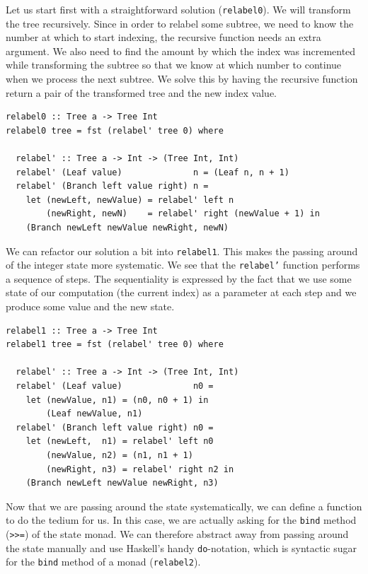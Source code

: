 \documentclass{article}
\begin{document}
Let us start first with a straightforward solution (\texttt{relabel0}). We
will transform the tree recursively. Since in order to relabel some subtree,
we need to know the number at which to start indexing, the recursive function
needs an extra argument. We also need to find the amount by which the index
was incremented while transforming the subtree so that we know at which number
to continue when we process the next subtree. We solve this by having the
recursive function return a pair of the transformed tree and the new index
value.

\begin{lstlisting}
relabel0 :: Tree a -> Tree Int
relabel0 tree = fst (relabel' tree 0) where

  relabel' :: Tree a -> Int -> (Tree Int, Int)
  relabel' (Leaf value)              n = (Leaf n, n + 1)
  relabel' (Branch left value right) n =
    let (newLeft, newValue) = relabel' left n
        (newRight, newN)    = relabel' right (newValue + 1) in
    (Branch newLeft newValue newRight, newN)
\end{lstlisting}

We can refactor our solution a bit into \texttt{relabel1}. This makes the
passing around of the integer state more systematic. We see that the
\texttt{relabel'} function performs a sequence of steps. The sequentiality is
expressed by the fact that we use some state of our computation (the current
index) as a parameter at each step and we produce some value and the new
state.

\begin{lstlisting}
relabel1 :: Tree a -> Tree Int
relabel1 tree = fst (relabel' tree 0) where

  relabel' :: Tree a -> Int -> (Tree Int, Int)
  relabel' (Leaf value)              n0 =
    let (newValue, n1) = (n0, n0 + 1) in
        (Leaf newValue, n1)
  relabel' (Branch left value right) n0 =
    let (newLeft,  n1) = relabel' left n0
        (newValue, n2) = (n1, n1 + 1)
        (newRight, n3) = relabel' right n2 in
    (Branch newLeft newValue newRight, n3)
\end{lstlisting}

Now that we are passing around the state systematically, we can define a
function to do the tedium for us. In this case, we are actually asking for the
\texttt{bind} method (\texttt{>>=}) of the state monad. We can therefore
abstract away from passing around the state manually and use Haskell's handy
\texttt{do}-notation, which is syntactic sugar for the \texttt{bind} method of
a monad (\texttt{relabel2}).
\end{document}
